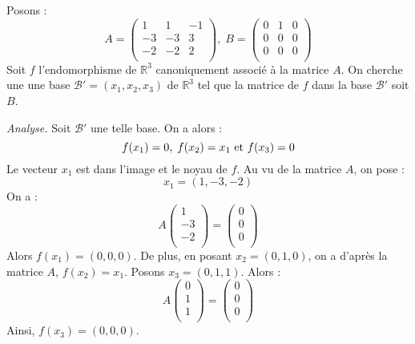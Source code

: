 \documentclass[a4paper,10pt]{report}
\begin{document}
\corr Posons :
$$ A = \begin{pmatrix}
1 & 1 & -1 \\
-3 & -3 & 3 \\
-2 & -2 & 2 \\
\end{pmatrix}, \;   B = \begin{pmatrix}
0 & 1 & 0 \\
0 & 0 & 0 \\
0 & 0 & 0 \\
\end{pmatrix}$$
Soit $f$ l'endomorphisme  de $\mathbb{R}^3$ canoniquement associé à la matrice $A$. On cherche une une base $\mathcal{B}'=(x_1,x_2,x_3)$ de $\mathbb{R}^3$ tel que la matrice de $f$ dans la base $\mathcal{B}'$ soit $B$. 

\medskip

\noindent \textit{Analyse.} Soit $\mathcal{B}'$ une telle base. On a alors :
$$ f(x_1)=0, \; f(x_2)=x_1 \hbox{ et } f(x_3)=0$$
Le vecteur $x_1$ est dans l'image et le noyau de $f$. Au vu de la matrice $A$, on pose :
$$ x_1 =(1,-3,-2)$$
On a :
$$ A \begin{pmatrix}
1 \\
-3 \\
-2\\
\end{pmatrix} = \begin{pmatrix}
0 \\
0 \\
0\\
\end{pmatrix}$$
Alors $f(x_1)=(0,0,0)$. De plus, en posant $x_2=(0,1,0)$, on a d'après la matrice $A$, $f(x_2)=x_1$. Posons $x_3=(0,1,1)$. Alors :
$$  A \begin{pmatrix}
0 \\
1 \\
1\\
\end{pmatrix} = \begin{pmatrix}
0 \\
0\\
0\\
\end{pmatrix}$$
Ainsi, $f(x_3)=(0,0,0)$.

\medskip
\end{document}
